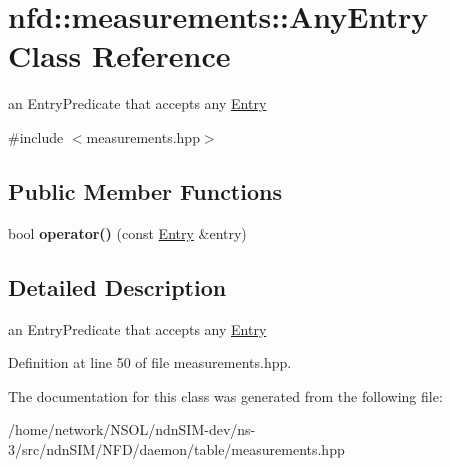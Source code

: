 \hypertarget{classnfd_1_1measurements_1_1AnyEntry}{}\section{nfd\+:\+:measurements\+:\+:Any\+Entry Class Reference}
\label{classnfd_1_1measurements_1_1AnyEntry}


an {\ttfamily Entry\+Predicate} that accepts any {\ttfamily \hyperlink{classnfd_1_1measurements_1_1Entry}{Entry}}  




{\ttfamily \#include $<$measurements.\+hpp$>$}

\subsection*{Public Member Functions}
\begin{DoxyCompactItemize}
\item 
bool {\bfseries operator()} (const \hyperlink{classnfd_1_1measurements_1_1Entry}{Entry} \&entry)\hypertarget{classnfd_1_1measurements_1_1AnyEntry_ad8add719ed24702a312dc1b12615b7f3}{}\label{classnfd_1_1measurements_1_1AnyEntry_ad8add719ed24702a312dc1b12615b7f3}

\end{DoxyCompactItemize}


\subsection{Detailed Description}
an {\ttfamily Entry\+Predicate} that accepts any {\ttfamily \hyperlink{classnfd_1_1measurements_1_1Entry}{Entry}} 

Definition at line 50 of file measurements.\+hpp.



The documentation for this class was generated from the following file\+:\begin{DoxyCompactItemize}
\item 
/home/network/\+N\+S\+O\+L/ndn\+S\+I\+M-\/dev/ns-\/3/src/ndn\+S\+I\+M/\+N\+F\+D/daemon/table/measurements.\+hpp\end{DoxyCompactItemize}
